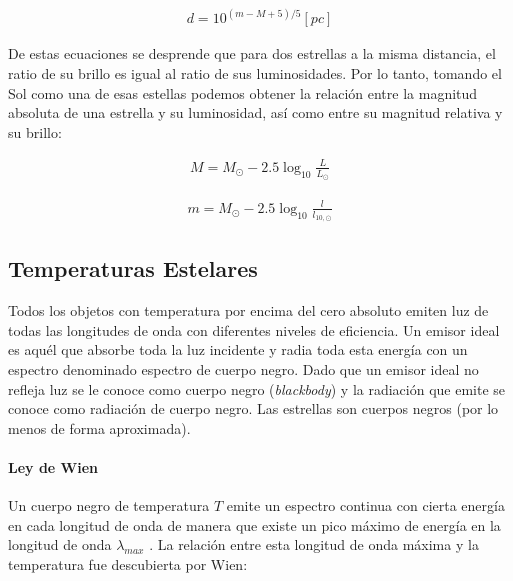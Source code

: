 \documentclass{tufte-handout}
\begin{document}
\begin{align}
  d = 10^{(m - M + 5)/5} [pc]
\end{align}


De estas ecuaciones se desprende que para dos estrellas a la misma distancia, el ratio de su brillo es igual al ratio de sus luminosidades. Por lo tanto, tomando el Sol como una de esas estellas podemos obtener la relación entre la magnitud absoluta de una estrella y su luminosidad, así como entre su magnitud relativa y su brillo:

\begin{align}
  M = M_{\odot} - 2.5 \log_{10}\frac{L}{L_{\odot}}
\end{align}

\begin{align}
  m = M_{\odot} - 2.5 \log_{10}\frac{l}{l_{10, \odot}}
\end{align}

\subsection{Temperaturas Estelares}

Todos los objetos con temperatura por encima del cero absoluto emiten luz de todas las longitudes de onda con diferentes niveles de eficiencia. Un emisor ideal es aquél que absorbe toda la luz incidente y radia toda esta energía con un espectro denominado espectro de cuerpo negro. Dado que un emisor ideal no refleja luz se le conoce como cuerpo negro (\emph{blackbody}) y la radiación que emite se conoce como radiación de cuerpo negro. Las estrellas son cuerpos negros (por lo menos de forma aproximada).

\paragraph{Ley de Wien}

Un cuerpo negro de temperatura $T$ emite un espectro continua con cierta energía en cada longitud de onda de manera que existe un pico máximo de energía en la longitud de onda $\lambda_{max}$ . La relación entre esta longitud de onda máxima y la temperatura fue descubierta por Wien:
\end{document}
